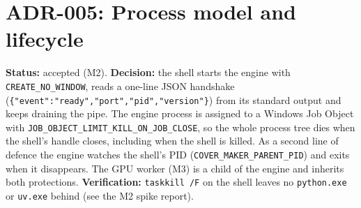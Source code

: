 \section{ADR-005: Process model and lifecycle}
\textbf{Status:} accepted (M2). \textbf{Decision:} the shell starts the engine
with \texttt{CREATE\_NO\_WINDOW}, reads a one-line JSON handshake
(\texttt{\{"event":"ready","port","pid","version"\}}) from its standard output and
keeps draining the pipe. The engine process is assigned to a Windows Job Object
with \texttt{JOB\_OBJECT\_LIMIT\_KILL\_ON\_JOB\_CLOSE}, so the whole process tree
dies when the shell's handle closes, including when the shell is killed. As a
second line of defence the engine watches the shell's PID
(\texttt{COVER\_MAKER\_PARENT\_PID}) and exits when it disappears. The GPU worker
(M3) is a child of the engine and inherits both protections.
\textbf{Verification:} \texttt{taskkill /F} on the shell leaves no
\texttt{python.exe} or \texttt{uv.exe} behind (see the M2 spike report).
